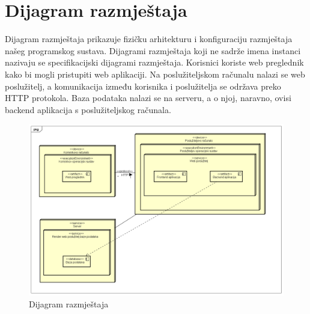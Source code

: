 			
			\eject 
		
		
		\section{Dijagram razmještaja}
			
		\noindent Dijagram razmještaja prikazuje fizičku arhitekturu i konfiguraciju razmještaja našeg programskog sustava. Dijagrami razmještaja koji ne sadrže imena instanci nazivaju se specifikacijski dijagrami razmještaja. Korisnici koriste web preglednik kako bi mogli pristupiti web aplikaciji. Na poslužiteljskom računalu nalazi se web poslužitelj, a komunikacija između korisnika i poslužitelja se održava preko HTTP protokola. Baza podataka nalazi se na serveru, a o njoj, naravno, ovisi backend aplikacija s poslužiteljskog računala.
			
			\begin{figure}[H]
				\centering
				\includegraphics[width=1\textwidth]{slike/dijagrami/Dijagram razmjestaja.png}
				\caption{Dijagram razmještaja}
				\label{fig:enter-label}
			\end{figure}	

